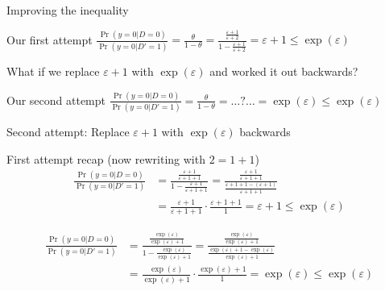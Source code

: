 \documentclass[12pt,aspectratio=169,handout]{beamer}
\begin{document}
\begin{frame}{Improving the inequality}

\begin{block}{Our first attempt}
$\frac{\Pr(y = 0 | D = 0)}{\Pr(y = 0 | D' = 1)} =
\frac{\theta}{1 - \theta} =
\frac{
\frac{\varepsilon + 1}{\varepsilon + 2}
}{
	1 - \frac{\varepsilon + 1}{\varepsilon + 2}
}
=
\varepsilon + 1
\leq \exp(\varepsilon)$
\end{block}

What if we replace $\varepsilon + 1$ with $\exp(\varepsilon)$ and worked it out backwards?


\begin{block}{Our second attempt}
$\frac{\Pr(y = 0 | D = 0)}{\Pr(y = 0 | D' = 1)} =
\frac{\theta}{1 - \theta} =
\ldots ? \ldots
=
\exp(\varepsilon)
\leq \exp(\varepsilon)$
\end{block}


\end{frame}






\begin{frame}{Second attempt: Replace $\varepsilon + 1$ with $\exp(\varepsilon)$ backwards}

\begin{block}{First attempt recap (now rewriting with $2 = 1 + 1$)}
$$
\begin{aligned}
\frac{\Pr(y = 0 | D = 0)}{\Pr(y = 0 | D' = 1)} &=
\frac{
\frac{\varepsilon + 1}{\varepsilon + 1 + 1}
}{
	1 - \frac{\varepsilon + 1}{\varepsilon + 1 + 1}
}
=
\frac{
\frac{\varepsilon + 1}{\varepsilon + 1 + 1}
}{
\frac{\varepsilon + 1 + 1 - (\varepsilon + 1)}{\varepsilon + 1 + 1}
}\\
&=
\frac{\varepsilon + 1}{\varepsilon + 1 + 1}
\cdot
\frac{\varepsilon + 1 + 1}{1}
=
\varepsilon + 1
\leq \exp(\varepsilon)
\end{aligned}
$$
\end{block}
\vspace{-1em}
$$
\begin{aligned}
\frac{\Pr(y = 0 | D = 0)}{\Pr(y = 0 | D' = 1)} &=
\frac{
\frac{ \exp(\varepsilon)}{ \exp(\varepsilon) + 1}
}{
	1 - \frac{ \exp(\varepsilon)}{ \exp(\varepsilon) + 1}
}
=
\frac{
\frac{ \exp(\varepsilon)}{ \exp(\varepsilon) + 1}
}{
\frac{ \exp(\varepsilon) + 1 -  \exp(\varepsilon)}{ \exp(\varepsilon) + 1}
}\\
&=
\frac{ \exp(\varepsilon)}{ \exp(\varepsilon) + 1}
\cdot
\frac{ \exp(\varepsilon) + 1}{1}
=
\exp(\varepsilon)
\leq \exp(\varepsilon)
\end{aligned}
$$
\end{frame}
\end{document}
